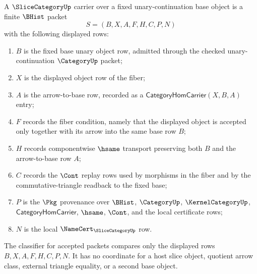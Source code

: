\begin{definition}
\label{def:slice-category-namecert-carrier}
A $\SliceCategoryUp$ carrier over a fixed unary-continuation base object is a finite $\BHist$ packet
$$
S=(B,X,A,F,H,C,P,N)
$$
with the following displayed rows:
\begin{enumerate}
\item $B$ is the fixed base unary object row, admitted through the checked unary-continuation $\CategoryUp$ packet;
\item $X$ is the displayed object row of the fiber;
\item $A$ is the arrow-to-base row, recorded as a $\mathsf{CategoryHomCarrier}(X,B,A)$ entry;
\item $F$ records the fiber condition, namely that the displayed object is accepted only together with its arrow into the same base row $B$;
\item $H$ records componentwise $\hsame$ transport preserving both $B$ and the arrow-to-base row $A$;
\item $C$ records the $\Cont$ replay rows used by morphisms in the fiber and by the commutative-triangle readback to the fixed base;
\item $P$ is the $\Pkg$ provenance over $\BHist$, $\CategoryUp$, $\KernelCategoryUp$, $\mathsf{CategoryHomCarrier}$, $\hsame$, $\Cont$, and the local certificate rows;
\item $N$ is the local $\NameCert_{\SliceCategoryUp}$ row.
\end{enumerate}
The classifier for accepted packets compares only the displayed rows $B,X,A,F,H,C,P,N$. It has no coordinate for a host slice object, quotient arrow class, external triangle equality, or a second base object.
\end{definition}

